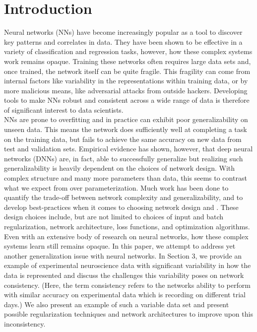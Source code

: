 \documentclass[12pt]{article}
\begin{document}
\section{Introduction}Neural networks (NNs) have become increasingly popular as a tool to discover key patterns and correlates in data. They have been shown to be effective in a variety of classification and regression tasks, however, how these complex systems work remains opaque. Training these networks often requires large data sets and, once trained, the network itself can be quite fragile. This fragility can come from internal factors like variability in the representations within  training data, or by more malicious means, like adversarial attacks from outside hackers. Developing tools to make NNs robust and consistent across a wide range of data is therefore of significant interest to data scientists. \\
\indent NNs are prone to overfitting and in practice can exhibit poor generalizability on unseen data. This means the network does sufficiently well at completing a task on the training data, but fails to achieve the same accuracy on new data from test and validation sets. Empirical evidence has shown, however, that deep neural networks (DNNs) are, in fact, able to successfully generalize but realizing such generalizability is heavily dependent on the choices of network design. With complex structure and many more parameters than data, this seems to contrast what we expect from over parameterization.  Much work has been done to quantify the trade-off between network complexity and generalizability, and to develop best-practices when it comes to choosing network design  \cite{zhang,genNN,drop_over} and \cite{batchgen}. These design choices include, but are not limited to choices of input and batch regularization, network architecture, loss functions, and optimization algorithms. Even with an extensive body of research on neural networks, how these complex systems learn still remains opaque. In this paper, we attempt to address yet another generalization issue with neural networks.  In Section 3, we provide an example of experimental neuroscience data with significant variability in how the data is represented and discuss the challenges this variability poses on network consistency. (Here, the term consistency refers to the networks ability to perform with similar accuracy on experimental data which is recording on different trial days.)  We also present an example of such a variable data set and present possible regularization techniques and network architectures to improve upon this inconsistency. \\
\end{document}
